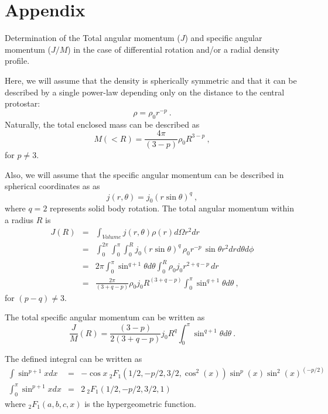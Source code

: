 \section{Appendix}
Determination of the Total angular momentum ($J$) and specific angular momentum ($J/M$) in the case of differential rotation and/or a radial density profile.

Here, we will assume that the density is spherically symmetric and that it can be described 
by a single power-law depending only on the distance to the central protostar:
\begin{equation}%
\rho = \rho_0 r^{-p}~.
\end{equation}
Naturally, the total enclosed mass can be described as 
\begin{equation}
M(<R) = \frac{4\pi}{(3-p)} \rho_0 R^{3-p}~,
\end{equation}
for $p\ne 3$.

Also, we will assume that the specific angular momentum can be described in spherical coordinates as as
\begin{equation}
j(r,\theta) = j_0 ( r \sin \theta)^q~,
\end{equation}
where $q=2$ represents solid body rotation.
%
The total angular momentum within a radius $R$ is
\begin{eqnarray}
J(R) &=& \int_{Volume} j(r,\theta) \rho(r) d\Omega r^2 dr \\
&=& \int_0^{2\pi}\int_{0}^{\pi}\int_0^R j_0 ( r \sin \theta)^q\, \rho_0 r^{-p}\, \sin\theta r^2 dr d\theta d\phi\\
&=& 2\pi \int_{0}^{\pi} \sin^{q+1} \theta d\theta \int_0^R \rho_0 j_0 r^{2+q-p} \,dr \nonumber \\
&=& \frac{2\pi}{(3+q-p)}\rho_0 j_0 R^{(3+q-p)} \int_{0}^{\pi} \sin^{q+1} \theta d\theta~,
\end{eqnarray}
for $(p-q)\ne 3$.

The total specific angular momentum can be written as
\begin{equation}
\frac{J}{M}(R) = \frac{(3-p)}{2(3+q-p)} j_0 R^{q} 
\int_{0}^{\pi} \sin^{q+1} \theta d\theta~.
\end{equation}

The defined integral can be written as 
\begin{eqnarray}
\int \sin^{p+1} x dx &=& -\cos{x} ~_2F_1(1/2, -p/2, 3/2, \cos^2(x)) \sin^p(x) \sin^2(x)^{(-p/2)}\\
\int_{0}^{\pi} \sin^{p+1} x dx &=&  2 ~_2F_1(1/2, -p/2, 3/2, 1)
\end{eqnarray}
where 
$_2F_1(a, b, c, x)$ is the hypergeometric function.

